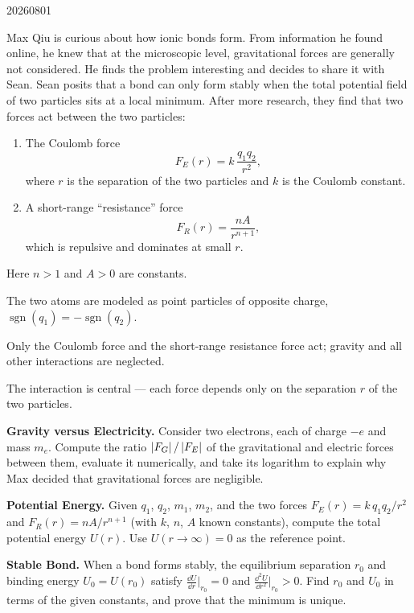 

\begin{problem}{20260801}

Max Qiu is curious about how ionic bonds form.  From information he found online, he knew that at the microscopic level, gravitational forces are generally not considered.  He finds the problem interesting and decides to share it with Sean.  Sean posits that a bond can only form stably when the total potential field of two particles sits at a local minimum.  After more research, they find that two forces act between the two particles:

\begin{enumerate}
  \item The Coulomb force
    \[
      F_E(r) = k\,\frac{q_1 q_2}{r^{2}},
    \]
    where $r$ is the separation of the two particles and $k$ is the Coulomb constant.
  \item A short-range ``resistance'' force
    \[
      F_R(r) = \frac{nA}{r^{n+1}},
    \]
    which is repulsive and dominates at small $r$.
\end{enumerate}

Here $n > 1$ and $A > 0$ are constants.

\begin{assumptions}
  \item The two atoms are modeled as point particles of opposite charge, $\operatorname{sgn}(q_1) = -\operatorname{sgn}(q_2)$.
  \item Only the Coulomb force and the short-range resistance force act; gravity and all other interactions are neglected.
  \item The interaction is central --- each force depends only on the separation $r$ of the two particles.
\end{assumptions}

\begin{questions}
  \item \textbf{Gravity versus Electricity.}
        Consider two electrons, each of charge $-e$ and mass $m_e$.  Compute the ratio $\left\lvert F_G \right\rvert/\left\lvert F_E \right\rvert$ of the gravitational and electric forces between them, evaluate it numerically, and take its logarithm to explain why Max decided that gravitational forces are negligible.
  \item \textbf{Potential Energy.}
        Given $q_1$, $q_2$, $m_1$, $m_2$, and the two forces $F_E(r) = k\,q_1 q_2/r^{2}$ and $F_R(r) = nA/r^{n+1}$ (with $k$, $n$, $A$ known constants), compute the total potential energy $U(r)$.  Use $U(r \to \infty) = 0$ as the reference point.
  \item \textbf{Stable Bond.}
        When a bond forms stably, the equilibrium separation $r_0$ and binding energy $U_0 = U(r_0)$ satisfy $\tfrac{\dd U}{\dd r}\big|_{r_0} = 0$ and $\tfrac{\dd^{2} U}{\dd r^{2}}\big|_{r_0} > 0$.  Find $r_0$ and $U_0$ in terms of the given constants, and prove that the minimum is unique.
\end{questions}


\end{problem}
